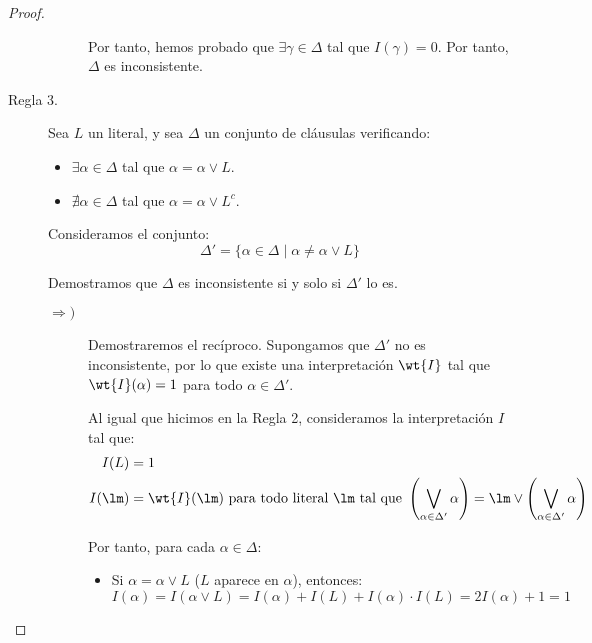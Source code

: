 \documentclass[12pt]{article}
\begin{document}
\begin{ejercicio}
\begin{proof}
\begin{description}
\begin{description}
                    Por tanto, hemos probado que $\exists \gamma\in \Delta$ tal que $I(\gamma)=0$. Por tanto, $\Delta$ es inconsistente.
                \end{description}

                \item[Regla 3.] Sea $L$ un literal, y sea $\Delta$ un conjunto de cláusulas verificando:
                \begin{itemize}
                    \item $\exists \alpha\in \Delta$ tal que $\alpha=\alpha\lor L$.
                    \item $\nexists \alpha\in \Delta$ tal que $\alpha=\alpha\lor L^c$.
                \end{itemize}

                Consideramos el conjunto:
                \begin{equation*}
                    \Delta'=\{\alpha\in \Delta\mid \alpha\neq \alpha\lor L\}
                \end{equation*}

                Demostramos que $\Delta$ es inconsistente si y solo si $\Delta'$ lo es.
                \begin{description}
                    \item[$\Longrightarrow)$] Demostraremos el recíproco. Supongamos que $\Delta'$ no es inconsistente, por lo que existe una interpretación $\wt{I}$ tal que $\wt{I}(\alpha)=1$ para todo $\alpha\in \Delta'$.
                    
                    Al igual que hicimos en la Regla 2, consideramos la interpretación $I$ tal que:
                    \begin{align*}
                        I(L)&=1\\
                        I(\lm)&=\wt{I}(\lm)\ \text{para todo literal}\ \lm\ \text{tal que} \ \left(\bigvee_{\alpha\in \Delta'} \alpha\right)=\lm\lor \left(\bigvee_{\alpha\in \Delta'} \alpha\right)
                    \end{align*}

                    Por tanto, para cada $\alpha\in \Delta$:
                    \begin{itemize}
                        \item Si $\alpha=\alpha\lor L$ ($L$ aparece en $\alpha$), entonces:
                        \begin{equation*}
                            I(\alpha)=I(\alpha\lor L)=I(\alpha)+I(L)+I(\alpha)\cdot I(L)=2I(\alpha)+1=1
                        \end{equation*}


\end{itemize}
\end{description}
\end{description}
\end{proof}
\end{ejercicio}
\end{document}
